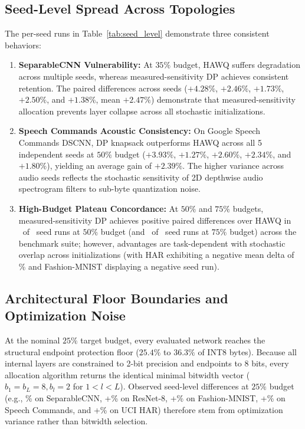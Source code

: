 \documentclass{ieeeaccess}
\begin{document}
\subsection{Seed-Level Spread Across Topologies}
The per-seed runs in Table~\ref{tab:seed_level} demonstrate three consistent behaviors:
\begin{enumerate}
    \item \textbf{SeparableCNN Vulnerability:} At $35\%$ budget, HAWQ suffers degradation across multiple seeds, whereas measured-sensitivity DP achieves consistent retention. The paired differences across seeds ($+4.28\%$, $+2.46\%$, $+1.73\%$, $+2.50\%$, and $+1.38\%$, mean $+2.47\%$) demonstrate that measured-sensitivity allocation prevents layer collapse across all stochastic initializations.
    \item \textbf{Speech Commands Acoustic Consistency:} On Google Speech Commands DSCNN, DP knapsack outperforms HAWQ across all 5 independent seeds at $50\%$ budget ($+3.93\%$, $+1.27\%$, $+2.60\%$, $+2.34\%$, and $+1.80\%$), yielding an average gain of $+2.39\%$. The higher variance across audio seeds reflects the stochastic sensitivity of 2D depthwise audio spectrogram filters to sub-byte quantization noise.
    \item \textbf{High-Budget Plateau Concordance:} At $50\%$ and $75\%$ budgets, measured-sensitivity DP achieves positive paired differences over HAWQ in \MacroSeedLevelPositiveFiftyCount\ of \MacroSeedLevelPositiveFiftyTotal\ seed runs at $50\%$ budget (and \MacroSeedLevelPositiveSeventyFiveCount\ of \MacroSeedLevelPositiveSeventyFiveTotal\ seed runs at $75\%$ budget) across the benchmark suite; however, advantages are task-dependent with stochastic overlap across initializations (with HAR exhibiting a negative mean delta of \MacroHARDeltasFifty\% and Fashion-MNIST displaying a negative seed run).
\end{enumerate}

\subsection{Architectural Floor Boundaries and Optimization Noise}
At the nominal $25\%$ target budget, every evaluated network reaches the structural endpoint protection floor ($25.4\%$ to $36.3\%$ of INT8 bytes). Because all internal layers are constrained to 2-bit precision and endpoints to 8 bits, every allocation algorithm returns the identical minimal bitwidth vector ($b_1 = b_L = 8, b_l = 2$ for $1 < l < L$). Observed seed-level differences at $25\%$ budget (e.g., \MacroFloorDeltaSepCNN\% on SeparableCNN, +\MacroFloorDeltaResNet\% on ResNet-8, +\MacroFloorDeltaFMNIST\% on Fashion-MNIST, +\MacroFloorDeltaSpeech\% on Speech Commands, and +\MacroFloorDeltaHAR\% on UCI HAR) therefore stem from optimization variance rather than bitwidth selection.

\EOD
\end{document}
